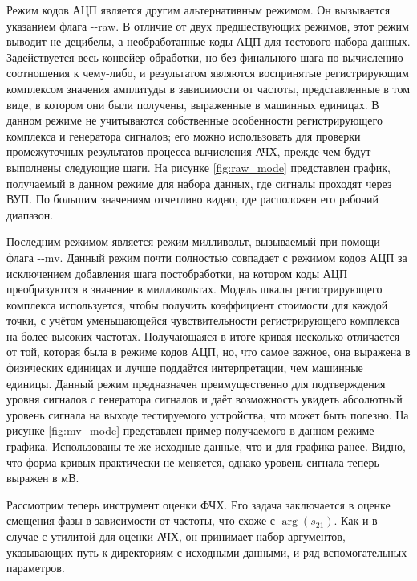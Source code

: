 \documentclass{report}
\begin{document}
Режим кодов АЦП является другим альтернативным режимом. Он вызывается указанием флага -{}-raw. В отличие от двух предшествующих режимов, этот режим выводит не децибелы, а необработанные коды АЦП для тестового набора данных. Задействуется весь конвейер обработки, но без финального шага по вычислению соотношения к чему-либо, и результатом являются воспринятые регистрирующим комплексом значения амплитуды в зависимости от частоты, представленные в том виде, в котором они были получены, выраженные в машинных единицах. В данном режиме не учитываются собственные особенности регистрирующего комплекса и генератора сигналов; его можно использовать для проверки промежуточных результатов процесса вычисления АЧХ, прежде чем будут выполнены следующие шаги. На рисунке \ref{fig:raw_mode} представлен график, получаемый в данном режиме для набора данных, где сигналы проходят через ВУП. По большим значениям отчетливо видно, где расположен его рабочий диапазон.


Последним режимом является режим милливольт, вызываемый при помощи флага -{}-mv. Данный режим почти полностью совпадает с режимом кодов АЦП за исключением добавления шага постобработки, на котором коды АЦП преобразуются в значение в милливольтах. Модель шкалы регистрирующего комплекса используется, чтобы получить коэффициент стоимости для каждой точки, с учётом уменьшающейся чувствительности регистрирующего комплекса на более высоких частотах. Получающаяся в итоге кривая несколько отличается от той, которая была в режиме кодов АЦП, но, что самое важное, она выражена в физических единицах и лучше поддаётся интерпретации, чем машинные единицы. Данный режим предназначен преимущественно для подтверждения уровня сигналов с генератора сигналов и даёт возможность увидеть абсолютный уровень сигнала на выходе тестируемого устройства, что может быть полезно. На рисунке \ref{fig:mv_mode} представлен пример получаемого в данном режиме графика. Использованы те же исходные данные, что и для графика ранее. Видно, что форма кривых практически не меняется, однако уровень сигнала теперь выражен в мВ.


Рассмотрим теперь инструмент оценки ФЧХ. Его задача заключается в оценке смещения фазы в зависимости от частоты, что схоже с $\arg(s_{21})$. Как и в случае с утилитой для оценки АЧХ, он принимает набор аргументов, указывающих путь к директориям с исходными данными, и ряд вспомогательных параметров.
\end{document}
